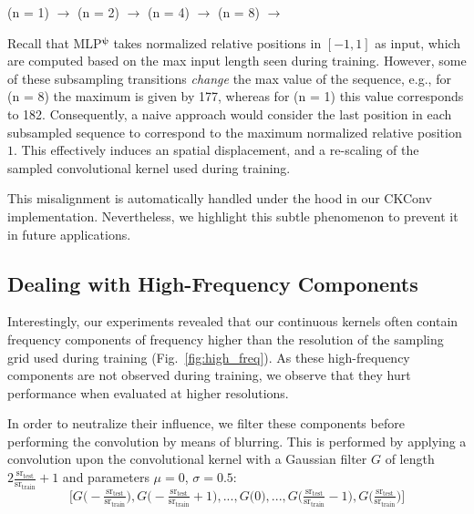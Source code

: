 \documentclass{article}
\newcommand{\mlp}{{\btt MLP}}
\begin{document}
{(\btt n = 1)} $\rightarrow$ {\btt [1, 2, 3, \ ... , 180, 181, 182]}\newline
{(\btt n = 2)} $\rightarrow$ {\btt [1, 3, 5, \   ... , 177, 179, 181]}\newline
{(\btt n = 4)} $\rightarrow$ {\btt [1, 5, 9, \  ... , 173, 177, 181]}\newline
{(\btt n = 8)} $\rightarrow$ {\btt [1, 9, 17, ... , 161, 169, 177]}

Recall that \mlp$^{\boldsymbol{\psi}}$ takes normalized relative positions in $[-1, 1]$ as input, which are computed based on the max input length seen during training. However, some of these subsampling transitions \textit{change} the max value of the sequence, e.g., for {(\btt n = 8)} the maximum is given by 177, whereas for {(\btt n = 1)} this value corresponds to 182. Consequently, a naive approach would consider the last position in each subsampled sequence to correspond to the maximum normalized relative position $1$. This effectively induces an spatial displacement, and a re-scaling of the sampled convolutional kernel used during training.

This misalignment is automatically handled under the hood in our {\btt CKConv} implementation. Nevertheless, we highlight this subtle phenomenon to prevent it in future applications.

\subsection{Dealing with High-Frequency Components}\label{appx:high_freq}
Interestingly, our experiments revealed that our continuous kernels often contain frequency components of frequency higher than the resolution of the sampling grid used during training (Fig.~\ref{fig:high_freq}). As these high-frequency components are not observed during training, we observe that they hurt performance when evaluated at higher resolutions. 

In order to neutralize their influence, we filter these components before performing the convolution by means of blurring. This is performed by applying a convolution upon the convolutional kernel with a Gaussian filter $G$ of length $2 \tfrac{\mathrm{sr}_\text{test}}{\mathrm{sr}_\text{train}} + 1$ and parameters $\mu{=}0$, $\sigma{=}0.5$:
$$\Big[G\big( - \tfrac{\mathrm{sr}_\text{test}}{\mathrm{sr}_\text{train}} \big) , G\big(-\tfrac{\mathrm{sr}_\text{test}}{\mathrm{sr}_\text{train}}+1\big), ... , G\big(0\big), ... , G\big(\tfrac{\mathrm{sr}_\text{test}}{\mathrm{sr}_\text{train}}-1\big), G\big(\tfrac{\mathrm{sr}_\text{test}}{\mathrm{sr}_\text{train}}\big)\Big]$$
\end{document}
